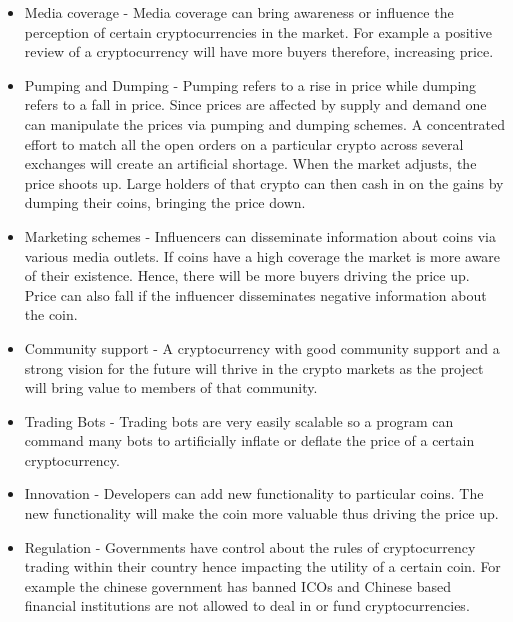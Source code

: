 \begin{itemize}


\item Media coverage - 
Media coverage can bring awareness or influence the perception of certain cryptocurrencies in the market. For example a positive review of a cryptocurrency will have more buyers therefore, increasing price.

\item Pumping and Dumping - 
Pumping refers to a rise in price while dumping refers to a fall in price. 
Since prices are affected by supply and demand one can manipulate the prices via pumping and dumping schemes. A concentrated effort to match all the open orders on a particular crypto across several exchanges will create an artificial shortage. When the market adjusts, the price shoots up. Large holders of that crypto can then cash in on the gains by dumping their coins, bringing the price down.

\item Marketing schemes -
Influencers can disseminate information about coins via various media outlets. If coins have a high coverage the market is more aware of their existence.  Hence, there will be more buyers driving the price up.  Price can also fall if the influencer disseminates negative information about the coin.

\item Community support - 
A cryptocurrency with good community support and a strong vision for the future will thrive in the crypto markets as the project will bring value to members of that community. 

\item Trading Bots - Trading bots are very easily scalable so a program can command many bots to artificially inflate or deflate the price of a certain cryptocurrency. 

\item Innovation - Developers can add new functionality to particular coins.  The new functionality will make the coin more valuable thus driving the price up.

\item Regulation - Governments have control about the rules of cryptocurrency trading within their country  hence impacting the utility of a certain coin.  For example the chinese government has banned ICOs and Chinese based financial institutions are not allowed to deal in or fund cryptocurrencies. 
\end{itemize}

